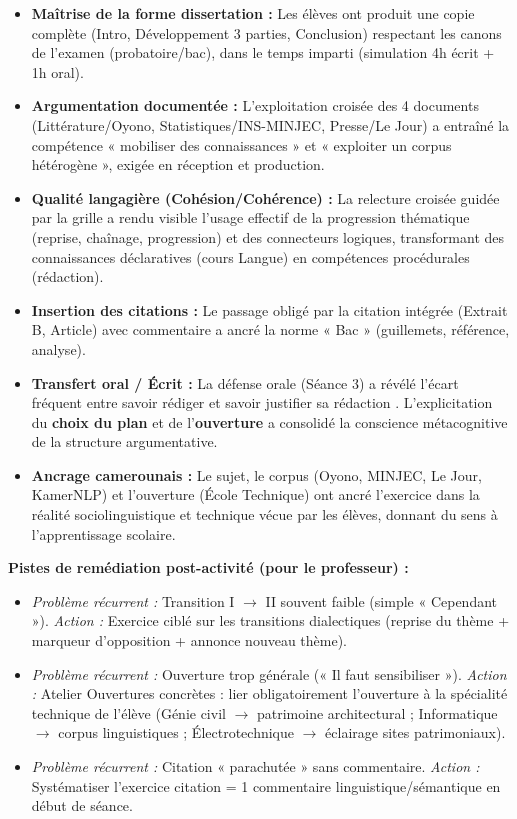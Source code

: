 \documentclass[11pt]{article}
\newcommand{\cle}[1]{{\popxbold\color{popdark}#1}}
\begin{document}
\begin{itemize}
    \item \textbf{Maîtrise de la forme dissertation :} Les élèves ont produit une copie complète (Intro, Développement 3 parties, Conclusion) respectant les canons de l'examen (probatoire/bac), dans le temps imparti (simulation 4h écrit + 1h oral).
    \item \textbf{Argumentation documentée :} L'exploitation croisée des 4 documents (Littérature/Oyono, Statistiques/INS-MINJEC, Presse/Le Jour) a entraîné la compétence \cle{« mobiliser des connaissances »} et \cle{« exploiter un corpus hétérogène »}, exigée en réception et production.
    \item \textbf{Qualité langagière (Cohésion/Cohérence) :} La relecture croisée guidée par la grille a rendu visible l'usage effectif de la \cle{progression thématique} (reprise, chaînage, progression) et des \cle{connecteurs logiques}, transformant des connaissances déclaratives (cours Langue) en compétences procédurales (rédaction).
    \item \textbf{Insertion des citations :} Le passage obligé par la citation intégrée (Extrait B, Article) avec commentaire a ancré la norme « Bac » (guillemets, référence, analyse).
    \item \textbf{Transfert oral / Écrit :} La défense orale (Séance 3) a révélé l'écart fréquent entre \og savoir rédiger \fg{} et \og savoir justifier sa rédaction \fg{}. L'explicitation du \textbf{choix du plan} et de l'\textbf{ouverture} a consolidé la conscience métacognitive de la structure argumentative.
    \item \textbf{Ancrage camerounais :} Le sujet, le corpus (Oyono, MINJEC, Le Jour, KamerNLP) et l'ouverture (École Technique) ont ancré l'exercice dans la réalité sociolinguistique et technique vécue par les élèves, donnant du sens à l'apprentissage scolaire.
\end{itemize}

\noindent \textbf{Pistes de remédiation post-activité (pour le professeur) :}
\begin{itemize}
    \item \textit{Problème récurrent :} Transition I $\rightarrow$ II souvent faible (simple « Cependant »). \textit{Action :} Exercice ciblé sur les \cle{transitions dialectiques} (reprise du thème + marqueur d'opposition + annonce nouveau thème).
    \item \textit{Problème récurrent :} Ouverture trop générale (« Il faut sensibiliser »). \textit{Action :} Atelier \og Ouvertures concrètes \fg{} : lier obligatoirement l'ouverture à la spécialité technique de l'élève (Génie civil $\rightarrow$ patrimoine architectural ; Informatique $\rightarrow$ corpus linguistiques ; Électrotechnique $\rightarrow$ éclairage sites patrimoniaux).
    \item \textit{Problème récurrent :} Citation « parachutée » sans commentaire. \textit{Action :} Systématiser l'exercice  citation = 1 commentaire linguistique/sémantique \fg{} en début de séance.
\end{itemize}
\end{document}
